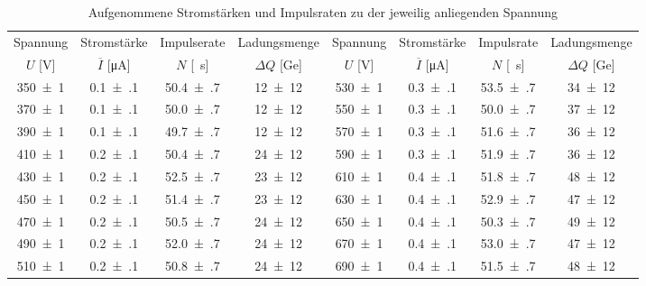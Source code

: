 \begin{table}[!h]
	\centering
	\begin{adjustbox}{width=\textwidth, center}
	\begin{tabular}{|c|c|c|c||c|c|c|c|}
		\hline
		Spannung & Stromstärke & Impulserate & Ladungsmenge & Spannung & Stromstärke & Impulsrate & Ladungsmenge\\
		$U$ [\si{\volt}] & $\overline{I}$ [\si{\micro\ampere}] & $N$ [\si{\per\second}] & $\Delta Q$ [\si{\giga e}] & $U$ [\si{\volt}] & $\overline{I}$ [\si{\micro\ampere}] & $N$ [\si{\per\second}] & $\Delta Q$ [\si{\giga e}]\\
\hline\hline
		\num{350(1)} & \num{0.1(1)} & \num{50.4(7)} & \num{12(12)} & \num{530(1)} & \num{0.3(1)} & \num{53.5(7)} & \num{34(12)}\\
		\num{370(1)} & \num{0.1(1)} & \num{50.0(7)} & \num{12(12)} & \num{550(1)} & \num{0.3(1)} & \num{50.0(7)} & \num{37(12)}\\
		\num{390(1)} & \num{0.1(1)} & \num{49.7(7)} & \num{12(12)} & \num{570(1)} & \num{0.3(1)} & \num{51.6(7)} & \num{36(12)}\\
		\num{410(1)} & \num{0.2(1)} & \num{50.4(7)} & \num{24(12)} & \num{590(1)} & \num{0.3(1)} & \num{51.9(7)} & \num{36(12)}\\
		\num{430(1)} & \num{0.2(1)} & \num{52.5(7)} & \num{23(12)} & \num{610(1)} & \num{0.4(1)} & \num{51.8(7)} & \num{48(12)}\\
		\num{450(1)} & \num{0.2(1)} & \num{51.4(7)} & \num{23(12)} & \num{630(1)} & \num{0.4(1)} & \num{52.9(7)} & \num{47(12)}\\
		\num{470(1)} & \num{0.2(1)} & \num{50.5(7)} & \num{24(12)} & \num{650(1)} & \num{0.4(1)} & \num{50.3(7)} & \num{49(12)}\\
		\num{490(1)} & \num{0.2(1)} & \num{52.0(7)} & \num{24(12)} & \num{670(1)} & \num{0.4(1)} & \num{53.0(7)} & \num{47(12)}\\
		\num{510(1)} & \num{0.2(1)} & \num{50.8(7)} & \num{24(12)} & \num{690(1)} & \num{0.4(1)} & \num{51.5(7)} & \num{48(12)}\\
		\hline
	\end{tabular}
	\end{adjustbox}
	\caption{Aufgenommene Stromstärken und Impulsraten zu der jeweilig anliegenden Spannung \label{tab:Auswertung_Ladungsmenge}}
\end{table}
















